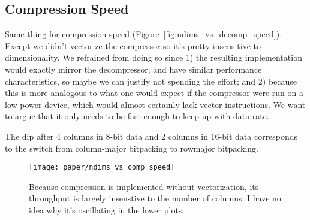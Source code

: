\subsection{Compression Speed}

Same thing for compression speed (Figure~\ref{fig:ndims_vs_decomp_speed}). Except we didn't vectorize the compressor so it's pretty insensitive to dimensionality. We refrained from doing so since 1) the resulting implementation would exactly mirror the decompressor, and have similar performance characteristics, so maybe we can justify not spending the effort; and 2) because this is more analogous to what one would expect if the compressor were run on a low-power device, which would almost certainly lack vector instructions. We want to argue that it only needs to be fast enough to keep up with data rate.

The dip after 4 columns in 8-bit data and 2 columns in 16-bit data corresponds to the switch from column-major bitpacking to rowmajor bitpacking.

\begin{figure}[h]
\begin{center}
    \texttt{[image: paper/ndims\_vs\_comp\_speed]}
    \caption{Because \minesp compression is implemented without vectorization, its throughput is largely insenstive to the number of columns. I have no idea why it's oscillating in the lower plots.}
    \label{fig:ndims_vs_comp_speed}
\end{center}
\end{figure}



